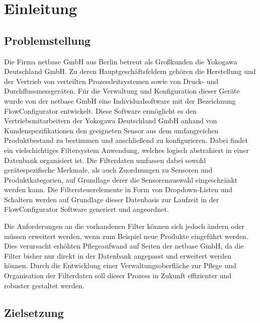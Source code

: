 \chapter{Einleitung}
\label{cha:Einleitung}

\section{Problemstellung}
\label{sec:Problemstellung}

Die Firma netbase GmbH aus Berlin betreut als Großkunden die Yokogawa Deutschland GmbH. Zu deren Hauptgeschäftsfeldern gehören die Herstellung und der Vertrieb von verteilten Prozessleitsystemen sowie von Druck- und Durchflussmessgeräten. Für die Verwaltung und Konfiguration dieser Geräte wurde von der netbase GmbH eine Individualsoftware mit der Bezeichnung FlowConfigurator entwickelt. Diese Software ermöglicht es den Vertriebsmitarbeitern der Yokogawa Deutschland GmbH anhand von Kundenspezifikationen den geeigneten Sensor aus dem umfangreichen Produktbestand zu bestimmen und anschließend zu konfigurieren. Dabei findet ein vielschichtiges Filtersystem Anwendung, welches logisch abstrahiert in einer Datenbank organisiert ist. Die Filterdaten umfassen dabei sowohl gerätespezifische Merkmale, als auch Zuordnungen zu Sensoren und Produktkategorien, auf Grundlage derer die Sensorenauswahl eingeschränkt werden kann. Die Filtersteuerelemente in Form von Dropdown-Listen und Schaltern werden auf Grundlage dieser Datenbasis zur Laufzeit in der FlowConfigurator Software generiert und angeordnet. 

Die Anforderungen an die vorhandenen Filter können sich jedoch ändern oder müssen erweitert werden, wenn zum Beispiel neue Produkte eingeführt werden. Dies verursacht erhöhten Pflegeaufwand auf Seiten der netbase GmbH, da die Filter bisher nur direkt in der Datenbank angepasst und erweitert werden können. Durch die Entwicklung einer Verwaltungsoberfläche zur Pflege und Organisation der Filterdaten soll dieser Prozess in Zukunft effizienter und robuster gestaltet werden.

\newpage

\section{Zielsetzung}
\label{sec:Zielsetzung}

